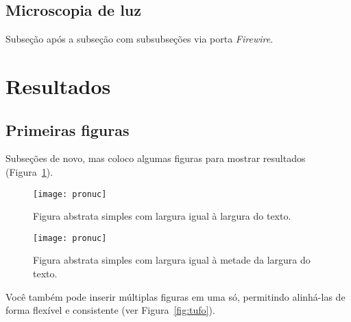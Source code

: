 \subsection{Microscopia de luz}\label{cap2:mem:micro}

Subseção após a subseção com subsubseções via porta \emph{Firewire}.

\section{Resultados}\label{cap2:res}

\subsection{Primeiras figuras}\label{cap2:res:figs}

Subseções de novo, mas coloco algumas figuras para mostrar resultados (Figura~\ref{fig:pronuc}).

\begin{figure}[htbp]
  \centering
  \texttt{[image: pronuc]}
  \caption[Figura simples]{Figura abstrata simples com largura igual à largura do texto.}
  \label{fig:pronuc}
\end{figure}

\begin{figure}[htbp]
  \centering
  \texttt{[image: pronuc]}
  \caption[Outra figura simples]{Figura abstrata simples com largura igual à metade da largura do texto.}
  \label{fig:pronuc2}
\end{figure}

Você também pode inserir múltiplas figuras em uma só, permitindo alinhá-las de forma flexível e consistente (ver Figura~\ref{fig:tufo}).

